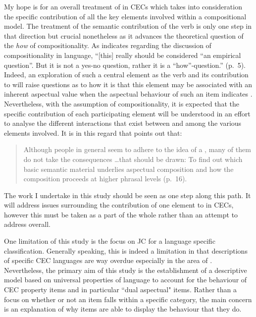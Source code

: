 My hope is for an overall treatment of  in CECs which takes into
consideration the specific contribution of all the key elements
involved within a compositional model.  The treatment of the semantic
contribution of the verb is only one step in that direction but
crucial nonetheless as it advances the theoretical question of the
\textit{how} of compositionality.  As \citet{Dowty2006} indicates
regarding the discussion of compositionality in language, ``[this]
really should be considered ``an empirical question''.  But it is not a
yes-no question, rather it is a ``how''-question.'' (p.~5).  Indeed, an
exploration of such a central element as the verb and its contribution
to  will raise questions as to how it is that this element may
be associated with an inherent aspectual value when the aspectual
behaviour of such an item indicates .
Nevertheless, with the assumption of compositionality, it is expected
that the specific contribution of each participating element will be
understood in an effort to analyse the different interactions that
exist between and among the various elements involved.  It is in this
regard that \citet{Verkuyl1999} points out that:

\begin{quote}
Although people in general seem to adhere to the idea of a
, many of them do not take the consequences
…that should be drawn: To find out which basic semantic material
underlies aspectual composition and how the composition proceeds at
higher phrasal levels (p.~16).
\end{quote}\largerpage

The work I undertake in this study should be seen as one step along
this path.  It will address issues surrounding the contribution of one
element to  in CECs, however this must be taken as a part of the
whole rather than an attempt to address  overall.

One limitation of this study is the focus on JC for a language
specific classification.  Generally speaking, this is indeed a
limitation in that descriptions of specific CEC languages are way
overdue especially in the area of .  Nevertheless, the primary
aim of this study is the establishment of a descriptive model based
on universal properties of language to account for the behaviour of
CEC property items and in particular ``dual aspectual" items.  Rather
than a focus on whether or not an item falls within a specific
category, the main concern is an explanation of why items are able to
display the behaviour that they do.

